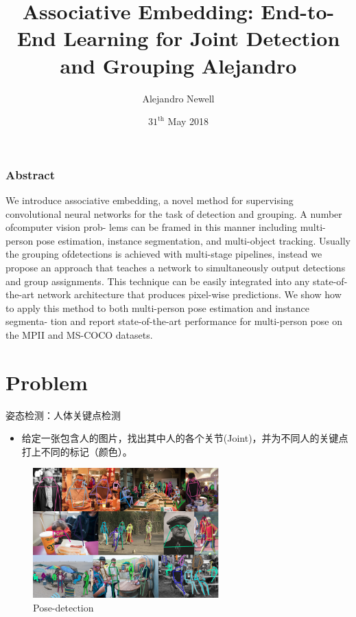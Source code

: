 \documentclass{ctexbeamer}
\title[NIPS2017]{Associative Embedding: End-to-End Learning for Joint Detection and Grouping Alejandro}
\author{Alejandro Newell\\}
\institute{\bf University of Michigan}
\date{$31^{\text{th}}$ May 2018}
\begin{document}
  
  \begin{frame}
    \titlepage
  \end{frame}

  \begin{frame}
    \frametitle{Abstract}
    We introduce associative embedding, a novel method for supervising convolutional neural networks for the task of detection and grouping. A number ofcomputer vision prob- lems can be framed in this manner including multi-person pose estimation, instance segmentation, and multi-object tracking. Usually the grouping ofdetections is achieved with multi-stage pipelines, instead we propose an approach that teaches a network to simultaneously output detections and group assignments. This technique can be easily integrated into any state-of-the-art network architecture that produces pixel-wise predictions. We show how to apply this method to both multi-person pose estimation and instance segmenta- tion and report state-of-the-art performance for multi-person pose on the MPII and MS-COCO datasets.
  \end{frame}
  
  
  \section{Problem}
  
  \begin{frame}{姿态检测：人体关键点检测}
  
  \begin{itemize}
    \item 给定一张包含人的图片，找出其中人的各个关节(Joint)，并为不同人的关键点打上不同的标记（颜色）。
  \end{itemize}
  
  \begin{figure}
  \includegraphics[height= 5cm]{fig/coco-positive.png}
  \caption{\label{fig:pose-detection}Pose-detection}
  \end{figure}
  \vskip 1cm
  
  \end{frame}
  
\end{document}
